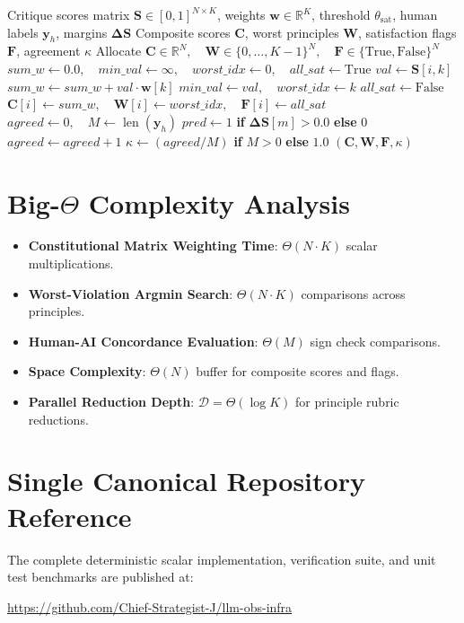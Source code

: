 \documentclass[11pt,a4paper]{article}
\theoremstyle{definition}
\begin{document}
\begin{algorithm}[H]
\caption{Constitutional AI Critique Evaluation and Agreement Tracking}
\begin{algorithmic}[1]
\Require Critique scores matrix $\mathbf{S} \in [0, 1]^{N \times K}$, weights $\mathbf{w} \in \mathbb{R}^K$, threshold $\theta_{\text{sat}}$, human labels $\mathbf{y}_h$, margins $\boldsymbol{\Delta S}$
\Ensure Composite scores $\mathbf{C}$, worst principles $\mathbf{W}$, satisfaction flags $\mathbf{F}$, agreement $\kappa$
\State Allocate $\mathbf{C} \in \mathbb{R}^N, \quad \mathbf{W} \in \{0, \dots, K-1\}^N, \quad \mathbf{F} \in \{\text{True}, \text{False}\}^N$
    \State $sum\_w \gets 0.0, \quad min\_val \gets \infty, \quad worst\_idx \gets 0, \quad all\_sat \gets \text{True}$
        \State $val \gets \mathbf{S}[i, k]$
        \State $sum\_w \gets sum\_w + val \cdot \mathbf{w}[k]$
            \State $min\_val \gets val, \quad worst\_idx \gets k$
        \EndIf
            \State $all\_sat \gets \text{False}$
        \EndIf
    \EndFor
    \State $\mathbf{C}[i] \gets sum\_w, \quad \mathbf{W}[i] \gets worst\_idx, \quad \mathbf{F}[i] \gets all\_sat$
\EndFor
\State $agreed \gets 0, \quad M \gets \operatorname{len}(\mathbf{y}_h)$
    \State $pred \gets 1$ \textbf{if} $\boldsymbol{\Delta S}[m] > 0.0$ \textbf{else} $0$
        \State $agreed \gets agreed + 1$
    \EndIf
\EndFor
\State $\kappa \gets (agreed / M)$ \textbf{if} $M > 0$ \textbf{else} $1.0$
\State \Return $(\mathbf{C}, \mathbf{W}, \mathbf{F}, \kappa)$
\end{algorithmic}
\end{algorithm}

\section{Big-$\Theta$ Complexity Analysis}

\begin{itemize}
    \item \textbf{Constitutional Matrix Weighting Time}: $\Theta(N \cdot K)$ scalar multiplications.
    \item \textbf{Worst-Violation Argmin Search}: $\Theta(N \cdot K)$ comparisons across principles.
    \item \textbf{Human-AI Concordance Evaluation}: $\Theta(M)$ sign check comparisons.
    \item \textbf{Space Complexity}: $\Theta(N)$ buffer for composite scores and flags.
    \item \textbf{Parallel Reduction Depth}: $\mathcal{D} = \Theta(\log K)$ for principle rubric reductions.
\end{itemize}

\section{Single Canonical Repository Reference}

The complete deterministic scalar implementation, verification suite, and unit test benchmarks are published at:
\begin{center}
\url{https://github.com/Chief-Strategist-J/llm-obs-infra}
\end{center}
\end{document}
